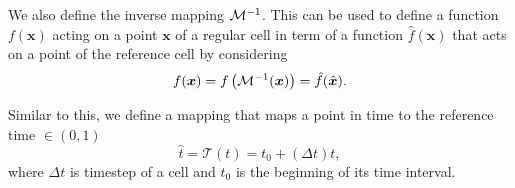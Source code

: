 We also define the inverse mapping $\mathcal{M}^{-1}$.
This can be used to define a function $f(\bm{x})$ acting on a point $\bm{x}$ of a regular cell in term of a function $\hat{f}(\bm{x})$ that acts on a point of the reference cell by considering
\begin{equation}
  \label{eq:function-ref-cell}
  f(\bm{x}) = f\left( \mathcal{M}^{-1}(\bm{x}) \right) = \hat{f}(\hat{\bm{x}}).
\end{equation}

Similar to this, we define a mapping that maps a point in time to the reference time $\in (0,1)$
\newcommand{\timeMapping}{\mathcal{T}}
\begin{equation}
  \label{eq:time-mapping}
  \hat{t} = \timeMapping(t) = t_0 + (\Delta t) t,
\end{equation}
where $\Delta t$ is timestep of a cell and $t_0$ is the beginning of its time interval.

